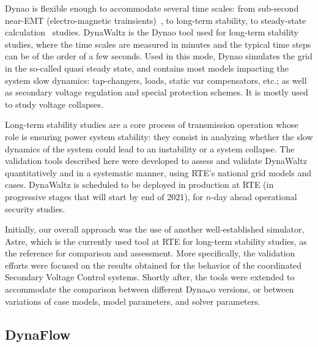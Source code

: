 \documentclass[conference]{IEEEtran}
\newcommand{\Dynawo}{Dyna\textomega o} %
\begin{document}
\Dynawo{} is flexible enough to accommodate several time scales: from sub-second
near-EMT (electro-magnetic trainsients)~\cite{Masoon21}, to long-term stability,
to steady-state calculation~\cite{Cossart21} studies. DynaWaltz is the \Dynawo{} tool used for long-term stability studies,
where the time scales are measured in minutes and the typical time steps can be
of the order of a few seconds. Used in this mode, \Dynawo{} simulates the grid
in the so-called quasi steady state, and contains most models impacting the
system slow dynamics: tap-changers, loads, static var compensators, etc.; as
well as secondary voltage regulation and special protection schemes. It is mostly used to study voltage collapses.

Long-term stability studies are a core process of transmission operation whose
role is ensuring power system stability: they consist in analyzing whether the
slow dynamics of the system could lead to an instability or a system
collapse. The validation tools described here were developed to assess and
validate DynaWaltz quantitatively and in a systematic manner, using RTE's
national grid models and cases. DynaWaltz is scheduled to be deployed in
production at RTE (in progressive stages that will start by end of 2021), for
$n$-day ahead operational security studies.

Initially, our overall approach was the use of another well-established
simulator, Astre, which is the currently used tool at RTE for long-term stability studies, as the reference for comparison and assessment. More
specifically, the validation efforts were focused on the results obtained for
the behavior of the coordinated Secondary Voltage Control systems. Shortly
after, the tools were extended to accommodate the comparison between different
Dyna$\omega$o versions, or between variations of case models, model parameters, and
solver parameters.



\subsection{DynaFlow}
\end{document}
